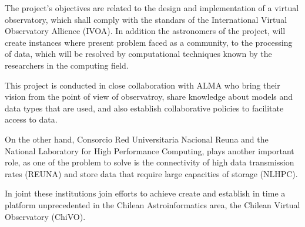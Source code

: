 The project's objectives are related to the design and implementation of a
virtual observatory, which shall comply with the standars of the International
Virtual Observatory Allience (IVOA). In addition the astronomers of the
project, will create instances where present problem faced as a community, to
the processing of data, which will be resolved by computational techniques
known by the researchers in the computing field.

This project is conducted in close collaboration with ALMA who bring their
vision from the point of view of observatroy, share knowledge about models and
data types that are used, and also establish collaborative policies to
facilitate access to data.

On the other hand, Consorcio Red Universitaria Nacional Reuna and the National
Laboratory for High Performance Computing, plays another important role, as one
of the problem to solve is the connectivity of high data transmission rates
(REUNA) and store data that require large capacities of storage (NLHPC).

In joint these institutions join efforts to achieve create and establish in
time a platform unprecedented in the Chilean Astroinformatics area, the Chilean
Virtual Observatory (ChiVO).
